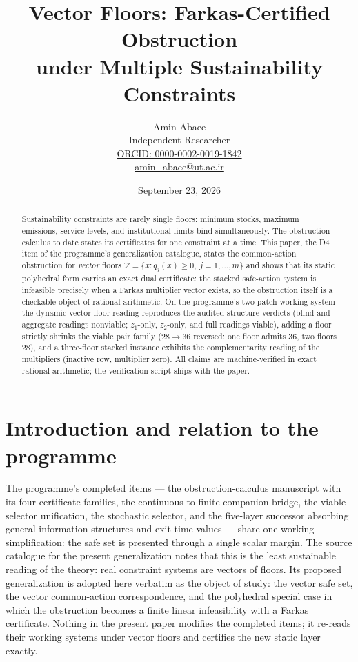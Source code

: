 \documentclass[10pt,twocolumn]{article}
\theoremstyle{definition}
\begin{document}
\title{Vector Floors: Farkas-Certified Obstruction\\ under Multiple Sustainability Constraints}
\author{Amin Abaee\\[0.35em]
{\small Independent Researcher}\\[0.55em]
{\small\href{https://orcid.org/0000-0002-0019-1842}{ORCID: 0000-0002-0019-1842}}\\[0.3em]
{\small\href{mailto:amin\_abaee@ut.ac.ir}{amin\_abaee@ut.ac.ir}}}
\date{September 23, 2026}
\maketitle

\begin{abstract}
Sustainability constraints are rarely single floors: minimum stocks, maximum
emissions, service levels, and institutional limits bind simultaneously. The
obstruction calculus to date states its certificates for one constraint at a
time. This paper, the D4 item of the programme's generalization catalogue,
states the common-action obstruction for \emph{vector} floors
$\mathcal V=\{x: q_j(x)\ge 0,\ j=1,\dots,m\}$ and shows that its static
polyhedral form carries an exact dual certificate: the stacked safe-action
system is infeasible precisely when a Farkas multiplier vector exists, so the
obstruction itself is a checkable object of rational arithmetic. On the
programme's two-patch working system the dynamic vector-floor reading
reproduces the audited structure verdicts (blind and aggregate readings
nonviable; $z_1$-only, $z_2$-only, and full readings viable), adding a floor
strictly shrinks the viable pair family ($28\to 36$ reversed: one floor
admits $36$, two floors $28$), and a three-floor stacked instance exhibits
the complementarity reading of the multipliers (inactive row, multiplier
zero). All claims are machine-verified in exact rational arithmetic; the
verification script ships with the paper.
\end{abstract}

\section{Introduction and relation to the programme}

The programme's completed items --- the obstruction-calculus manuscript with
its four certificate families, the continuous-to-finite companion bridge,
the viable-selector unification, the stochastic selector, and the five-layer
successor absorbing general information structures and exit-time values ---
share one working simplification: the safe set is presented through a single
scalar margin. The source catalogue for the present generalization notes
that this is the least sustainable reading of the theory: real constraint
systems are vectors of floors. Its proposed generalization is adopted here
verbatim as the object of study: the vector safe set, the vector
common-action correspondence, and the polyhedral special case in which the
obstruction becomes a finite linear infeasibility with a Farkas certificate.
Nothing in the present paper modifies the completed items; it re-reads their
working systems under vector floors and certifies the new static layer
exactly.
\end{document}
